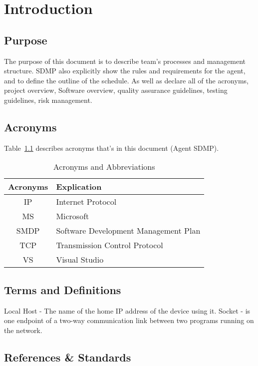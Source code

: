 \documentclass[letterpaper,12pt,oneside,listof=totoc]{scrreprt}
\begin{document}
\chapter{Introduction}

\section{Purpose}
The purpose of this document is to describe team's processes and management structure. SDMP also explicitly show the rules and requirements for the agent, and to define the outline of the schedule. As well as declare all of the acronyms, project overview, Software overview, quality assurance guidelines, testing guidelines, risk management.


\section{Acronyms}
Table~\ref{Acronyms} describes acronyms that's in this document (Agent SDMP).

\begin{table}[h!]
\centering
\begin{tabular}{| c | p{} |} 
\hline
Acronyms & Explication\\

\hline
IP & Internet Protocol\\
\hline
MS & Microsoft \\
\hline
SMDP & Software Development Management Plan\\
\hline
TCP & Transmission Control Protocol\\
\hline
VS & Visual Studio\\
\hline
\end{tabular}
\caption{Acronyms and Abbreviations}
\label{Acronyms}
\end{table}

\section{Terms and Definitions}
Local Host - The name of the home IP address of the device using it.\newline
Socket - is one endpoint of a two-way communication link between two programs running on the network.\newline


\section{References \& Standards}
\end{document}
